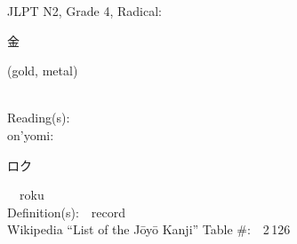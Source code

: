 \begin{multicols}{2}
{JLPT N2, Grade 4, Radical:\ \ {\begin{CJK}{UTF8}{min} 金 \end{CJK}} (gold, metal) } \\
Reading(s):\ \ \\
{\hspace*{1em}}on'yomi:\ \ \\
{\hspace*{2em}}{\begin{CJK}{UTF8}{min} ロク \end{CJK}}\ \ roku\ \ \\
Definition(s):\ \ record \\
Wikipedia ``List of the J\=oy\=o Kanji'' Table \#:\ \ 2\,126 \\
\ \ \\
\end{multicols}

\newpage



